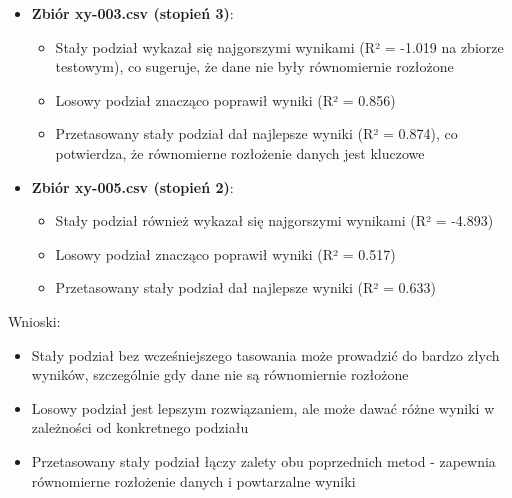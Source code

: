 \documentclass{article}
\begin{document}
\begin{itemize}
    \item \textbf{Zbiór xy-003.csv (stopień 3)}:
    \begin{itemize}
        \item Stały podział wykazał się najgorszymi wynikami (R² = -1.019 na zbiorze testowym), co sugeruje, że dane nie były równomiernie rozłożone
        \item Losowy podział znacząco poprawił wyniki (R² = 0.856)
        \item Przetasowany stały podział dał najlepsze wyniki (R² = 0.874), co potwierdza, że równomierne rozłożenie danych jest kluczowe
    \end{itemize}

    \item \textbf{Zbiór xy-005.csv (stopień 2)}:
    \begin{itemize}
        \item Stały podział również wykazał się najgorszymi wynikami (R² = -4.893)
        \item Losowy podział znacząco poprawił wyniki (R² = 0.517)
        \item Przetasowany stały podział dał najlepsze wyniki (R² = 0.633)
    \end{itemize}
\end{itemize}

Wnioski:
\begin{itemize}
    \item Stały podział bez wcześniejszego tasowania może prowadzić do bardzo złych wyników, szczególnie gdy dane nie są równomiernie rozłożone
    \item Losowy podział jest lepszym rozwiązaniem, ale może dawać różne wyniki w zależności od konkretnego podziału
    \item Przetasowany stały podział łączy zalety obu poprzednich metod - zapewnia równomierne rozłożenie danych i powtarzalne wyniki
\end{itemize}
\end{document}
